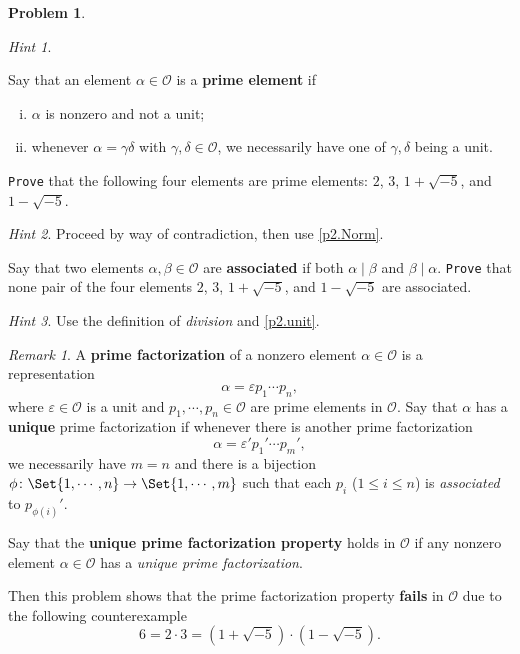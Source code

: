 \documentclass[11pt]{article}
\theoremstyle{plain}
\theoremstyle{definition}
\newtheorem{problem}{Problem}
\theoremstyle{remark}
\newtheorem*{remark}{Remark}
\newtheorem*{hint}{Hint}
\numberwithin{equation}{problem}
\begin{document}
\begin{problem}
\begin{listinprob}
\begin{hint}
		\end{hint}
		\item Say that an element $\alpha\in\mathscr{O}$ is a \textbf{prime element} if 
		\begin{enumerate}[(i)]
			\item $\alpha$ is nonzero and not a unit;
			\item whenever $\alpha=\gamma\delta$ with $\gamma, \delta \in \mathscr{O}$, we necessarily have one of $\gamma, \delta$ being a unit.
		\end{enumerate}
		\texttt{Prove} that the following four elements are prime elements: $2$, $3$, $1+\sqrt{-5}$, and $1-\sqrt{-5}$.
		\begin{hint}
			Proceed by way of contradiction, then use \cref{p2.Norm}.
		\end{hint}
		\item Say that two elements $\alpha,\beta\in\mathscr{O}$ are \textbf{associated} if both $\alpha\mid\beta$ and $\beta\mid\alpha$. 
		\texttt{Prove} that none pair of the four elements $2$, $3$, $1+\sqrt{-5}$, and $1-\sqrt{-5}$ are associated. 
		\begin{hint}
			Use the definition of \emph{division} and \cref{p2.unit}.
		\end{hint}
	\end{listinprob}
	\begin{remark}
		A \textbf{prime factorization} of a nonzero element $\alpha\in\mathscr{O}$ is a representation
		\[
			\alpha = \varepsilon p_1\cdots p_n,	
		\]
		where $\varepsilon\in\mathscr{O}$ is a unit and $p_1,\cdots,p_n\in\mathscr{O}$ are prime elements in $\mathscr{O}$. 
		Say that $\alpha$ has a \textbf{unique} prime factorization if whenever there is another prime factorization
		\[
			\alpha = \varepsilon' p_1'\cdots p_m', 
		\]
		we necessarily have $m=n$ and there is a bijection $\phi\colon\Set{1,\cdots,n}\to\Set{1,\cdots,m}$ such that each $p_i$ ($1\le i\le n$) is \emph{associated} to $p_{\phi(i)}'$.

		Say that the \textbf{unique prime factorization property} holds in $\mathscr{O}$ if any nonzero element $\alpha\in\mathscr{O}$ has a \emph{unique prime factorization}. 

		Then this problem shows that the prime factorization property \textbf{fails} in $\mathscr{O}$ due to the following counterexample
		\[
			6 = 2\cdot 3 = (1+\sqrt{-5})\cdot(1-\sqrt{-5}).
		\]
	\end{remark}
\end{problem}
\end{document}
